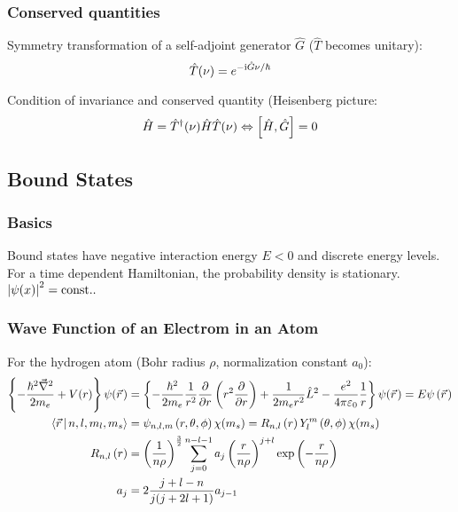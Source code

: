 		\subsubsection{Conserved quantities}
			\noindent
			Symmetry transformation of a self-adjoint generator $\hat{G}$ ($\hat{T}$ becomes unitary):
			\begin{equation}
				\hat{T}(\nu) = e^{-\mathrm{i}\hat{G}\nu/\hbar}
			\end{equation}

			\noindent
			Condition of invariance  and conserved quantity (Heisenberg picture:
			\begin{equation}
				\hat{H} =\hat{T}^\dagger(\nu)\hat{H} \hat{T}(\nu) \Leftrightarrow \left[\hat{H},\hat{G}\right] = 0
			\end{equation}

	\subsection{Bound States}
		\subsubsection{Basics}
			\noindent
			Bound states have negative interaction energy $E<0$ and discrete energy levels. For a time dependent Hamiltonian, the probability density is stationary.
			 $\left|\psi(x)\right|^2=\mathrm{const.}.$

		\subsubsection{Wave Function of an Electrom in an Atom}
			\noindent
			For the hydrogen atom (Bohr radius $\rho$, normalization constant $a_0$):
			\begin{equation}
				\begin{aligned}
					\cBr{-\frac{\hbar^2 \Nabla^2}{2 m_e} + V(r)}\psi(\pvec{r})
					&= \cBr{-\frac{\hbar^2}{2 m_e}\frac{1}{r^2}\pder{}{r}\Br{r^2\pder{}{r}} + \frac{1}{2 m_e r^2} \hat{L}^2 - \frac{e^2}{4\pi\varepsilon_0}\frac{1}{r}}\psi(\pvec{r})
					= E \psi\Br{\pvec{r}}
					\\
					\Braket{\vec{r}|n,l,m_l,m_s} &= \psi_{n,l,m}\left(r,\theta,\phi\right)\chi(m_s)
					= R_{n,l}\left(r\right) Y_l^m\left(\theta,\phi\right)\chi(m_s) \\
					R_{n,l}\left(r\right)
					&= \left(\frac{1}{n\rho}\right)^{\frac{3}{2}}
					\sum_{j=0}^{n-l-1} a_j \left(\frac{r}{n\rho}\right)^{j+l} \exp\left({-\frac{r}{n\rho}}\right) \\
					a_j &= 2\frac{j+l-n}{j(j+2l+1)} a_{j-1} \\
				\end{aligned}
			\end{equation}

